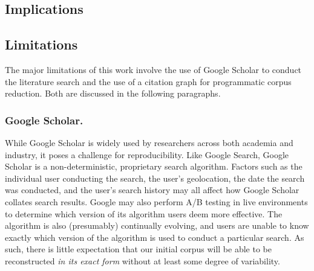\documentclass[manuscript,screen,review]{acmart}
\begin{document}



\subsection{Implications}


\subsection{Limitations}
The major limitations of this work involve the use of Google Scholar to conduct the literature search and the use of a citation graph for programmatic corpus reduction. Both are discussed in the following paragraphs.

\subsubsection{Google Scholar.} While Google Scholar is widely used by researchers across both academia and industry, it poses a challenge for reproducibility. Like Google Search, Google Scholar is a non-deterministic, proprietary search algorithm. Factors such as the individual user conducting the search, the user's geolocation, the date the search was conducted, and the user's search history may all affect how Google Scholar collates search results. Google may also perform A/B testing in live environments to determine which version of its algorithm users deem more effective. The algorithm is also (presumably) continually evolving, and users are unable to know exactly which version of the algorithm is used to conduct a particular search. As such, there is little expectation that our initial corpus will be able to be reconstructed \textit{in its exact form} without at least some degree of variability.
\end{document}
